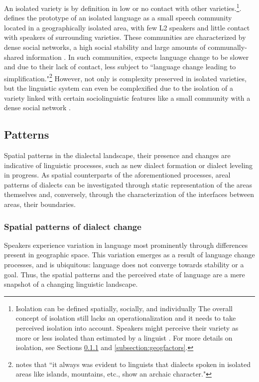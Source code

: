 \documentclass[output=paper]{langscibook}
\begin{document}
An isolated variety is by definition in low or no contact with other varieties.\footnote{Isolation can be defined spatially, socially, and individually  \parencite{Schreier2009, Schreier.2014} The overall concept of isolation still lacks an operationalization \parencite[353--355]{Schreier.2017} and it needs to take perceived isolation into account. Speakers might perceive their variety as more or less isolated than estimated by a linguist \parencite[]{Montgomery.2000}.
For more details on isolation, see Sections \ref{subsubsection:spatial patterns} and \ref{subsection:geogfactors}.}. \textcite[][]{Trudgill.1992} defines the prototype of an isolated language as a small speech community located in a geographically isolated area, with few L2 speakers and little contact with speakers of surrounding varieties. These communities are characterized by dense social networks, a high social stability and large amounts of communally-shared information \parencite[146]{Trudgill.2011}. In such communities, \textcite[6]{Trudgill.1996} expects language change to be slower and due to their lack of contact, less subject to “language change leading to simplification."\footnote{\textcite[349]{Manczak.1988} notes that “it always was evident to linguists that dialects spoken in isolated areas like islands, mountains, etc., show an archaic character."} However, not only is complexity preserved in isolated varieties, but the linguistic system can even be complexified due to the isolation of a variety linked with certain sociolinguistic features like a small community with a dense social network \parencite[]{Trudgill.2009}.

\subsection{Patterns} 
\label{Subsection:Patterns}

Spatial patterns in the dialectal landscape, their presence and changes are indicative of linguistic processes, such as new dialect formation or dialect leveling in progress.
As  spatial counterparts of the aforementioned processes, areal patterns of dialects can be investigated through static representation of the areas themselves and, conversely, through the characterization of the interfaces between areas, their boundaries.

\subsubsection{Spatial patterns of dialect change}
\label{subsubsection:spatial patterns}
\begin{sloppypar}
Speakers experience variation in language most prominently through differences present in geographic space. This variation emerges as a result of language change processes, and is ubiquitous: language does not converge towards stability or a goal. Thus, the spatial patterns and the perceived state of language are a mere snapshot of a changing linguistic landscape. 
\end{sloppypar}
\end{document}
